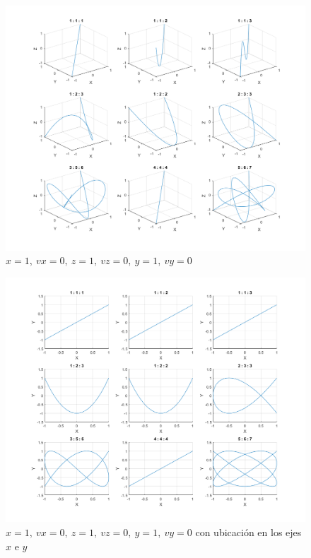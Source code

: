 \documentclass{article}
\begin{document}
\clearpage
\newpage

\begin{figure}
\centering
    \includegraphics[width=1\textwidth]{images/03a1.png}
    \caption{$x = 1,~vx = 0,~z = 1,~vz = 0,~y = 1,~vy = 0$}
\end{figure}

\clearpage
\newpage

\begin{figure}
\centering
    \includegraphics[width=1\textwidth]{images/03a2.png}
    \caption{$x = 1,~vx = 0,~z = 1,~vz = 0,~y = 1,~vy = 0$ con ubicación en los ejes $x$ e $y$}
\end{figure}
\end{document}
